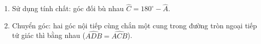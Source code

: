 \begin{enumerate}
\item Sử dụng tính chất: góc đối bù nhau $\widehat{C} = 180^\circ - \widehat{A}$.
\item Chuyển góc: hai góc nội tiếp cùng chắn một cung trong đường tròn ngoại tiếp tứ giác thì bằng nhau ($\widehat{ADB} = \widehat{ACB}$).
\end{enumerate}
